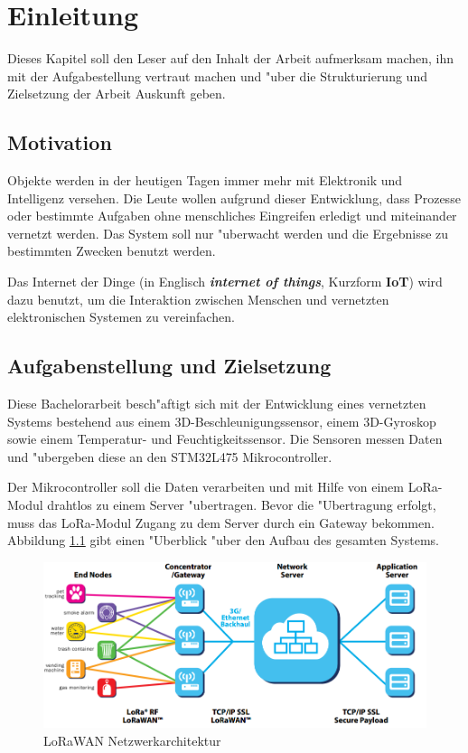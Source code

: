 
\chapter{Einleitung}

Dieses Kapitel soll den Leser auf den Inhalt der Arbeit aufmerksam machen, ihn mit der Aufgabestellung vertraut machen und "uber die Strukturierung und Zielsetzung der Arbeit Auskunft geben.


\section{Motivation}
Objekte werden in der heutigen Tagen immer mehr mit Elektronik und Intelligenz versehen. Die Leute wollen aufgrund dieser Entwicklung, dass Prozesse oder bestimmte Aufgaben ohne menschliches Eingreifen erledigt und miteinander vernetzt werden. Das System soll nur "uberwacht werden und die Ergebnisse zu bestimmten Zwecken benutzt werden.

Das Internet der Dinge (in Englisch \textbf{\textit{internet of things}}, Kurzform \textbf{IoT}) wird dazu benutzt, um die Interaktion zwischen Menschen und vernetzten elektronischen Systemen zu vereinfachen. 


\section{Aufgabenstellung und Zielsetzung}
Diese Bachelorarbeit besch"aftigt sich mit der Entwicklung eines vernetzten Systems bestehend aus einem 3D-Beschleunigungssensor, einem 3D-Gyroskop sowie einem Tem\-peratur- und Feuchtigkeitssensor. Die Sensoren messen Daten und "ubergeben diese an den STM32L475 Mikrocontroller.

Der Mikrocontroller soll die Daten verarbeiten und mit Hilfe von einem LoRa-Modul\cite{AT_Command} drahtlos zu einem Server "ubertragen. Bevor die "Ubertragung erfolgt, muss das LoRa-Modul Zugang zu dem Server durch ein Gateway bekommen. Abbildung \ref{LRWAN} gibt einen "Uberblick "uber den Aufbau des gesamten Systems.

\begin{figure}[h]	
	\includegraphics[width=15cm]{source/images/LoRaWAN_NET}
	\caption{LoRaWAN Netzwerkarchitektur \cite{LoRaWAN}}\label{LRWAN}
\end{figure}

